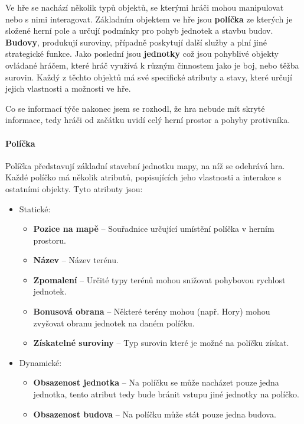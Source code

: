 Ve hře se nachází několik typů objektů, se kterými hráči mohou manipulovat nebo s nimi interagovat. Základním objektem ve hře jsou \textbf{políčka} ze kterých je složené herní pole a určují podmínky pro pohyb jednotek a stavbu budov. \textbf{Budovy}, produkují suroviny, případně poskytují další služby a plní jiné strategické funkce. Jako poslední jsou \textbf{jednotky} což jsou pohyblivé objekty ovládané hráčem, které hráč využívá k různým činnostem jako je boj, nebo těžba surovin. Každý z těchto objektů má své specifické atributy a stavy, které určují jejich vlastnosti a možnosti ve hře.

Co se informací týče nakonec jsem se rozhodl, že hra nebude mít skryté informace, tedy hráči od začátku uvidí celý herní prostor a pohyby protivníka.


\paragraph{Políčka}
Políčka představují základní stavební jednotku mapy, na níž se odehrává hra. Každé políčko má několik atributů, popisujících jeho vlastnosti a interakce s ostatními objekty. Tyto atributy jsou:
\begin{itemize}
    \item Statické:
    \begin{itemize}
        \item \textbf{Pozice na mapě} -- Souřadnice určující umístění políčka v herním prostoru.
        \item \textbf{Název} -- Název terénu.
        \item \textbf{Zpomalení} -- Určité typy terénů mohou snižovat pohybovou rychlost jednotek. 
        \item \textbf{Bonusová obrana} -- Některé terény mohou (např. Hory) mohou zvyšovat obranu jednotek na daném políčku.
        \item \textbf{Získatelné suroviny} -- Typ surovin které je možné na políčku získat.
    \end{itemize}
    \item Dynamické:
    \begin{itemize}
        \item \textbf{Obsazenost jednotka} -- Na políčku se může nacházet pouze jedna jednotka, tento atribut tedy bude bránit vstupu jiné jednotky na políčko.
    \item \textbf{Obsazenost budova} -- Na políčku může stát pouze jedna budova.
    \end{itemize}
\end{itemize}

